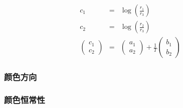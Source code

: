 \documentclass{beamer}
\begin{document}
{{\begin{frame}
  \begin{eqnarray*}
    c_1 & = & \log \left( \frac{r_1}{r_3} \right)\\
    c_2 & = & \log \left( \frac{r_2}{r_3} \right)\\
    \left(\begin{array}{c}
      c_1\\
      c_2
    \end{array}\right) & = & \left(\begin{array}{c}
      a_1\\
      a_2
    \end{array}\right) + \frac{1}{T} \left(\begin{array}{c}
      b_1\\
      b_2
    \end{array}\right)
  \end{eqnarray*}
\end{frame}}{\begin{frame}
  \frametitle{颜色方向}
  
  \quad{}
\end{frame}}{\frametitle{颜色恒常性}

\

\

}}
\end{document}

